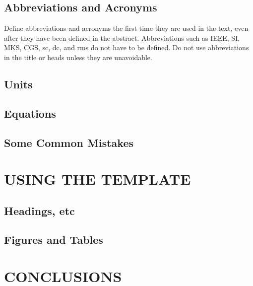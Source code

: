 \documentclass[letterpaper, 10 pt, conference]{ieeeconf}  %
\begin{document}
\subsection{Abbreviations and Acronyms} Define abbreviations and acronyms the first time they are used in the text, even after they have been defined in the abstract. Abbreviations such as IEEE, SI, MKS, CGS, sc, dc, and rms do not have to be defined. Do not use abbreviations in the title or heads unless they are unavoidable.

\subsection{Units}




\subsection{Equations}



\subsection{Some Common Mistakes}



\section{USING THE TEMPLATE}


\subsection{Headings, etc}



\subsection{Figures and Tables}



\section{CONCLUSIONS}






\end{document}
